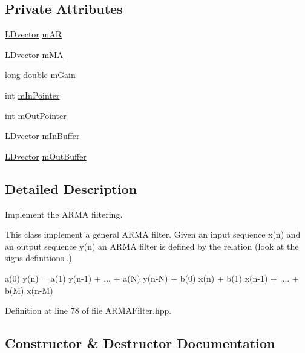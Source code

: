 \subsection*{Private Attributes}
\begin{DoxyCompactItemize}
\item 
\hyperlink{namespacetsa_ad1e65e148c1b8be13ee4da5b246b5adf}{L\+Dvector} \hyperlink{classtsa_1_1_a_r_m_a_filter_abadc75a208b4e28e28e7341c6bbfbbce}{m\+AR}
\item 
\hyperlink{namespacetsa_ad1e65e148c1b8be13ee4da5b246b5adf}{L\+Dvector} \hyperlink{classtsa_1_1_a_r_m_a_filter_aa4b780d4db5a5c5326e92f1c766613fb}{m\+MA}
\item 
long double \hyperlink{classtsa_1_1_a_r_m_a_filter_abb62dc2fe30975bb49e0105915143169}{m\+Gain}
\item 
int \hyperlink{classtsa_1_1_a_r_m_a_filter_a12aaa04dea7ac6d48c99c66319286ae4}{m\+In\+Pointer}
\item 
int \hyperlink{classtsa_1_1_a_r_m_a_filter_a223497bf7eb2f652a8c776f67837e6e9}{m\+Out\+Pointer}
\item 
\hyperlink{namespacetsa_ad1e65e148c1b8be13ee4da5b246b5adf}{L\+Dvector} \hyperlink{classtsa_1_1_a_r_m_a_filter_aa8de4abbeb3ed3078a7e9f1440619ac1}{m\+In\+Buffer}
\item 
\hyperlink{namespacetsa_ad1e65e148c1b8be13ee4da5b246b5adf}{L\+Dvector} \hyperlink{classtsa_1_1_a_r_m_a_filter_a45a752b94a28a77c8269bee486d0c85c}{m\+Out\+Buffer}
\end{DoxyCompactItemize}


\subsection{Detailed Description}
Implement the A\+R\+MA filtering. 

This class implement a general A\+R\+MA filter. Given an input sequence x(n) and an output sequence y(n) an A\+R\+MA filter is defined by the relation (look at the signs definitions..)

a(0) y(n) = a(1) y(n-\/1) + ... + a(\+N) y(n-\/N) + b(0) x(n) + b(1) x(n-\/1) + .... + b(\+M) x(n-\/M) 

Definition at line 78 of file A\+R\+M\+A\+Filter.\+hpp.



\subsection{Constructor \& Destructor Documentation}
\mbox{\label{classtsa_1_1_a_r_m_a_filter_acfa4406559bb327a4bfd5139db46f941}} 
